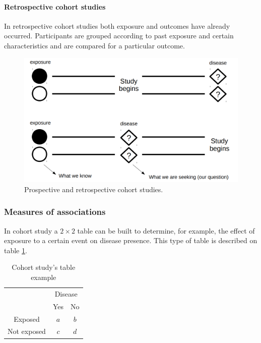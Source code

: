 		\paragraph{Retrospective cohort studies}
		In retrospective cohort studies both exposure and outcomes have already occurred.
		Participants are grouped according to past exposure and certain characteristics and are compared for a particular outcome.

		\begin{figure}[H]
		\centering
		\includegraphics[scale=0.2]{cohort}
		\caption{Prospective and retrospective cohort studies.}
		\end{figure}

		\subsubsection{Measures of associations}
		In cohort study a $2\times 2$ table can be built to determine, for example, the effect of exposure to a certain event on disease presence.
		This type of table is described on table \ref{tab:risk_table}.

		\begin{table}[H]
			\centering
			\begin{tabular}{ccc}
				 & \multicolumn{2}{c}{Disease}\\
				 & Yes & No \\
				 \cline{2-3}
				 Exposed & \multicolumn{1}{|c|}{$a$} & \multicolumn{1}{|c|}{$b$}\\
				 \cline{2-3}
				 Not exposed & \multicolumn{1}{|c|}{$c$} & \multicolumn{1}{|c|}{$d$}\\
				 \cline{2-3}
			\end{tabular}
			\caption{Cohort study's table example}
			\label{tab:risk_table}
		\end{table}

